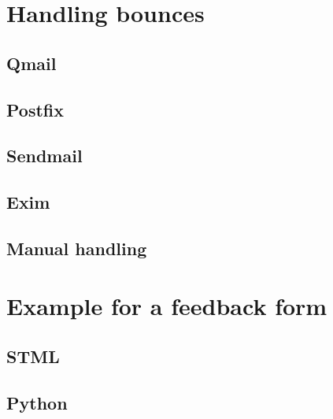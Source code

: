 \documentclass{article}
\begin{document}
\section{Handling bounces}
\subsection{Qmail}
\subsection{Postfix}
\subsection{Sendmail}
\subsection{Exim}
\subsection{Manual handling}

\section{Example for a feedback form}
\subsection{STML}
\subsection{Python}
\end{document}
